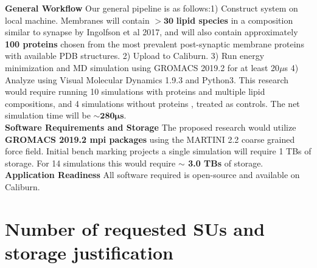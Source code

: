 \documentclass[oneside]{report}
\begin{document}
{ \bf General Workflow} Our general pipeline is as follows:1) Construct system on local machine. Membranes will contain $\pmb{>30}$ \textbf{lipid species} in a composition similar to synapse by Ingolfson et al 2017\cite{Ingolfsson2017a}, and will also contain approximately \textbf{100 proteins} chosen from the most prevalent post-synaptic membrane proteins with available PDB structures. 2) Upload to Caliburn. 3) Run energy minimization and MD simulation using GROMACS 2019.2 \cite{Berendsen1995} for at least 20$\mu$s 4) Analyze using Visual Molecular Dynamics 1.9.3 \cite{HUMP96} and Python3. 
This research would require running 10 simulations with proteins and multiple lipid compositions, and 4 simulations without proteins , treated as controls. The net simulation time will be $\pmb{\sim 280 \mu s}$. \\


{\bf Software Requirements and Storage} The proposed research would utilize \textbf{GROMACS 2019.2 mpi packages } \cite{Berendsen1995} using the MARTINI 2.2\cite{Marrink2007} coarse grained force field.  Initial bench marking projects a single simulation will require 1 TBs of storage. For 14 simulations this would require \textbf{$\sim$ 3.0 TBs} of storage.\\


{\bf Application Readiness} All software required is open-source and available on Caliburn.\\ %

\section*{Number of requested SUs and storage justification}
\end{document}
